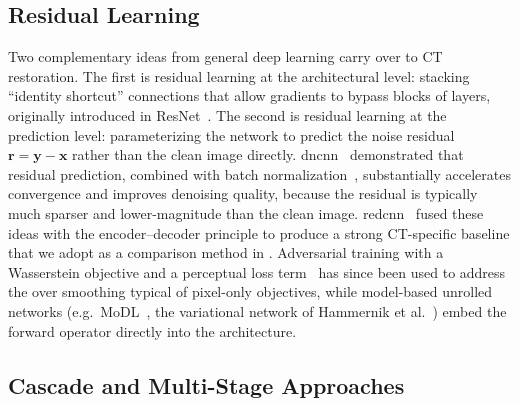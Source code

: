 \subsection{Residual Learning}
\label{subsec:bg_residual}

Two complementary ideas from general deep learning carry over to CT restoration. The first is residual learning at the architectural level: stacking ``identity shortcut'' connections that allow gradients to bypass blocks of layers, originally introduced in ResNet~\cite{He2016}. The second is residual learning at the prediction level:
parameterizing the network to predict the noise residual $\boldsymbol{r} = \boldsymbol{y} - \boldsymbol{x}$ rather than the clean image directly. \gls{dncnn}~\cite{Zhang2017} demonstrated that residual prediction, combined with batch normalization~\cite{Ioffe2015}, substantially accelerates convergence and improves denoising quality, because
the residual is typically much sparser and lower-magnitude than the clean image. \gls{redcnn}~\cite{Chen2017} fused these ideas with the encoder--decoder principle to produce a strong CT-specific baseline that we adopt as a comparison method in . Adversarial training with a Wasserstein objective and a perceptual loss term~\cite{Yang2018WGAN} has since been used to address the over smoothing typical of pixel-only objectives, while model-based unrolled networks
(e.g.\ MoDL~\cite{Aggarwal2019MoDL}, the variational network of Hammernik et al.~\cite{Hammernik2018VarNet}) embed the forward operator directly into the architecture.

\subsection{Cascade and Multi-Stage Approaches}
\label{subsec:bg_cascades}

